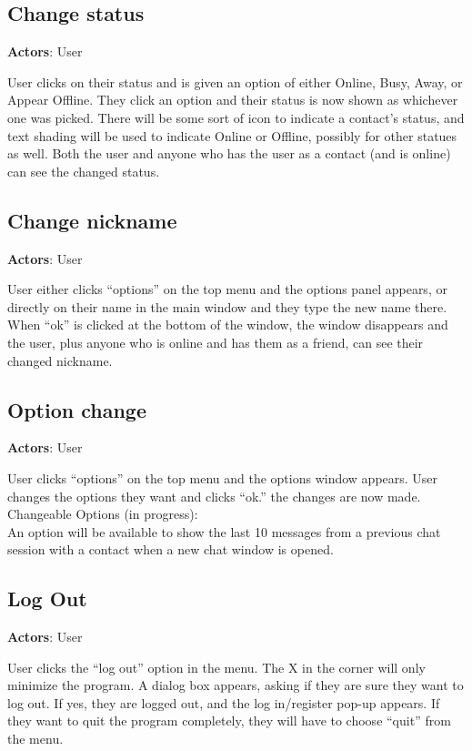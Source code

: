 \subsection{Change status}

{\bf Actors}: User

User clicks on their status and is given an option of either Online, Busy, Away, or Appear Offline. They click an option and their status is now shown as whichever one was picked. There will be some sort of icon to indicate a contact’s status, and text shading will be used to indicate Online or Offline, possibly for other statues as well. Both the user and anyone who has the user as a contact (and is online) can see the changed status.

\subsection{Change nickname}

{\bf Actors}: User

User either clicks “options” on the top menu and the options panel appears, or directly on their name in the main window and they type the new name there. When “ok” is clicked at the bottom of the window, the window disappears and the user, plus anyone who is online and has them as a friend, can see their changed nickname.

\subsection{Option change}

{\bf Actors}: User

User clicks “options” on the top menu and the options window appears. User changes the options they want and clicks “ok.” the changes are now made. \\
Changeable Options (in progress):\\
An option will be available to show the last 10 messages from a previous chat session with a contact when a new chat window is opened.

\subsection{Log Out}

{\bf Actors}: User

User clicks the “log out” option in the menu. The X in the corner will only minimize the program. A dialog box appears, asking if they are sure they want to log out. If yes, they are logged out, and the log in/register pop-up appears. If they want to quit the program completely, they will have to choose “quit” from the menu.

